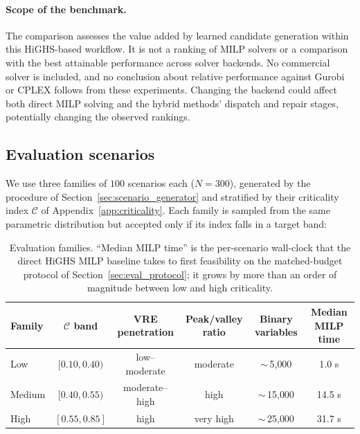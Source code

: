 \documentclass{article}
\begin{document}
\paragraph{Scope of the benchmark.}
The comparison assesses the value added by learned candidate generation within this HiGHS-based workflow. It is not a ranking of MILP solvers or a comparison with the best attainable performance across solver backends. No commercial solver is included, and no conclusion about relative performance against Gurobi or CPLEX follows from these experiments. Changing the backend could affect both direct MILP solving and the hybrid methods' dispatch and repair stages, potentially changing the observed rankings.

\subsection{Evaluation scenarios}
\label{sec:eval_scenarios}

We use three families of $100$ scenarios each ($N=300$), generated by the procedure of Section~\ref{sec:scenario_generator} and stratified by their criticality index $\mathcal{C}$ of Appendix~\ref{app:criticality}. Each family is sampled from the same parametric distribution but accepted only if its index falls in a target band:

\begin{table}[htbp]
\centering
\small
\begin{tabular}{lccccc}
\toprule
Family & $\mathcal{C}$ band & VRE penetration & Peak/valley ratio & Binary variables & Median MILP time \\
\midrule
Low    & $[0.10, 0.40)$ & low--moderate   & moderate          & $\sim$\,5{,}000 & 1.0 s \\
Medium & $[0.40, 0.55)$ & moderate--high  & high              & $\sim$\,15{,}000 & 14.5 s \\
High   & $[0.55, 0.85]$ & high            & very high         & $\sim$\,25{,}000 & 31.7 s \\
\bottomrule
\end{tabular}
\caption{Evaluation families. ``Median MILP time'' is the per-scenario wall-clock that the direct HiGHS MILP baseline takes to first feasibility on the matched-budget protocol of Section~\ref{sec:eval_protocol}; it grows by more than an order of magnitude between low and high criticality.}
\label{tab:eval_families}
\end{table}
\end{document}
